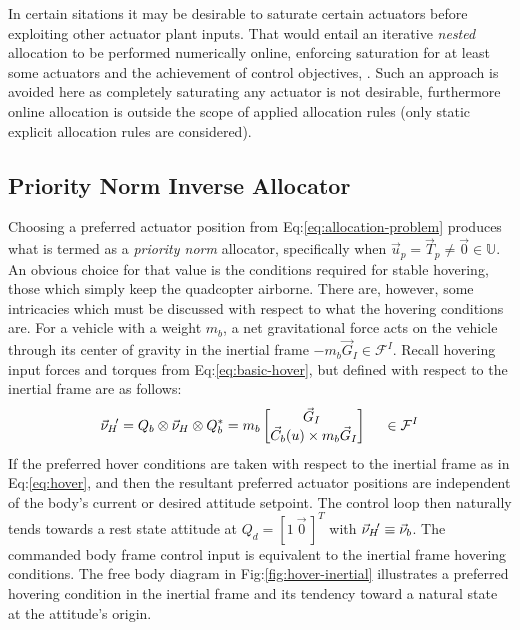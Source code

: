 \par
In certain sitations it may be desirable to saturate certain actuators before exploiting other actuator plant inputs. That would entail an iterative \emph{nested} allocation to be performed numerically online, enforcing saturation for at least some actuators and the achievement of control objectives, \cite{allocation}. Such an approach is avoided here as completely saturating any actuator is not desirable, furthermore online allocation is outside the scope of applied allocation rules (only static explicit allocation rules are considered).
\subsection{Priority Norm Inverse Allocator}
\label{subsec:allocation.allocators.norminverse}
Choosing a preferred actuator position from Eq:\ref{eq:allocation-problem} produces what is termed as a \emph{priority norm} allocator, specifically when $\vec{u}_p=\vec{T}_p\not=\vec{0}\in\mathbb{U}$. An obvious choice for that value is the conditions required for stable hovering, those which simply keep the quadcopter airborne. There are, however, some intricacies which must be discussed with respect to what the hovering conditions are.
\newpage
For a vehicle with a weight $m_b$, a net gravitational force acts on the vehicle through its center of gravity in the inertial frame $-m_b\vec{G}_I\in\mathcal{F}^I$. Recall hovering input forces and torques from Eq:\ref{eq:basic-hover}, but defined with respect to the inertial frame are as follows:
\begin{equation}\label{eq:hover}
\vec{\nu}_H\text{}\hspace{-2pt}'=Q_b\otimes\vec{\nu}_H\otimes Q_b^*
=
m_b\begin{bmatrix}
\vec{G}_I\hspace{3pt}\\
\vec{C}_b(u) \times m_b\vec{G}_I
\end{bmatrix}~~~~\in\mathcal{F}^I
\end{equation}
If the preferred hover conditions are taken with respect to the inertial frame as in Eq:\ref{eq:hover}, and then the resultant preferred actuator positions are independent of the body's current or desired attitude setpoint. The control loop then naturally tends towards a rest state attitude at $Q_d=[1~\vec{0}\hspace{2pt}]^T$ with $\vec{\nu}_H\text{}\hspace{-2pt}'\equiv\vec{\nu}_b$. The commanded body frame control input is equivalent to the inertial frame hovering conditions. The free body diagram in Fig:\ref{fig:hover-inertial} illustrates a preferred hovering condition in the inertial frame and its tendency toward a natural state at the attitude's origin.
